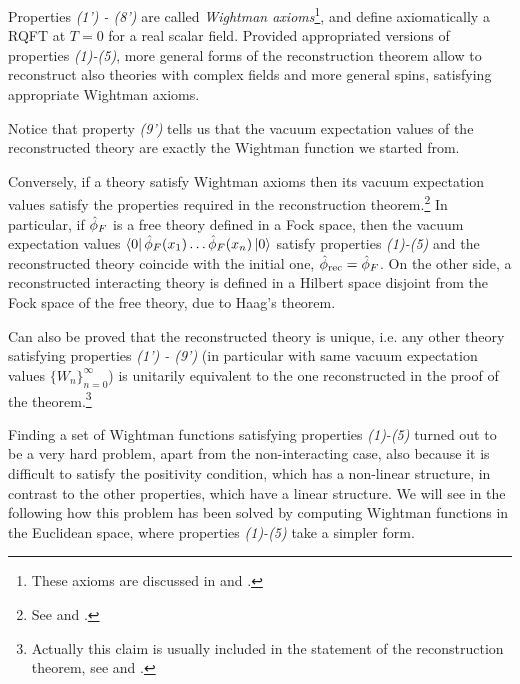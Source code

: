 \documentclass[../main/main.tex]{subfiles}
\begin{document}
Properties \textit{(1') - (8')} are called \emph{Wightman axioms}\footnote{These axioms are discussed in \cite[Section 3.1]{Streater:2000} and \cite[Section 3.2]{Jost.:1965}.}, and define axiomatically a RQFT at $T=0$ for a real scalar field. Provided appropriated versions of properties \textit{(1)-(5)}, more general forms of the reconstruction theorem allow to reconstruct also theories with complex fields and more general spins, satisfying appropriate Wightman axioms. 

Notice that property \textit{(9')} tells us that the vacuum expectation values of the reconstructed theory are exactly the Wightman function we started from. 

Conversely, if a theory satisfy Wightman axioms then its vacuum expectation values satisfy the properties required in the reconstruction theorem.\footnote{See \cite[Theorems 3.1-3.4]{Streater:2000} and \cite[Section 3.3]{Jost.:1965}.}  In particular, if $\hat{\phi}_F$ is a free theory defined in a Fock space, then the vacuum expectation values $\langle0\vert\,\hat{\phi}_F(x_1)\ldots\hat{\phi}_F(x_n)\,\vert0\rangle$ satisfy properties \textit{(1)-(5)} and the reconstructed theory coincide with the initial one, $\hat{\phi}_{\text{rec}}=\hat{\phi}_F$. On the other side, a reconstructed interacting theory is defined in a Hilbert space disjoint from the Fock space of the free theory, due to Haag's theorem. 

Can also be proved that the reconstructed theory is unique, i.e. any other theory satisfying properties \textit{(1') - (9')} (in particular with same vacuum expectation values $\{W_n\}_{n=0}^\infty$) is unitarily equivalent to the one reconstructed in the proof of the theorem.\footnote{Actually this claim is usually included in the statement of the reconstruction theorem, see \cite[Thm. 3.7]{Streater:2000} and \cite[Section 3.4, Thm. 1]{Jost.:1965}.} 

Finding a set of Wightman functions satisfying properties \textit{(1)-(5)} turned out to be a very hard problem, apart from the non-interacting case, also because it is difficult to satisfy the positivity condition, which has a non-linear structure, in contrast to the other properties, which have a linear structure. We will see in the following how this problem has been solved by computing Wightman functions in the Euclidean space, where properties \textit{(1)-(5)} take a simpler form.
\end{document}
